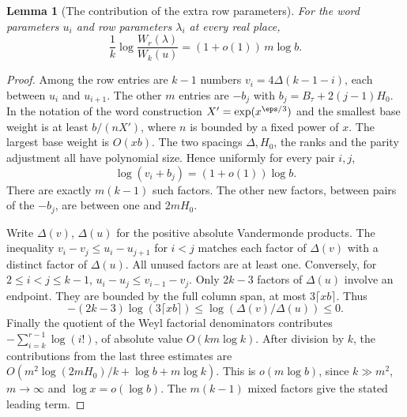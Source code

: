 \documentclass[a4paper,11pt]{article}
\newtheorem{lemma}[proposition]{Lemma}
\theoremstyle{definition}
\theoremstyle{remark}
\numberwithin{equation}{section}
\begin{document}
\begin{lemma}[The contribution of the extra row parameters]
\label{lem:weyl209}
For the word parameters \(u_i\) and row parameters \(\lambda_i\)
at every real place,
\[
       \frac{1}{k}\log\frac{W_r(\lambda)}{W_k(u)}
                             =(1+o(1))\,m\log b .
\]
\end{lemma}
\begin{proof}
Among the row entries are \(k-1\) numbers
\(v_i=4\Delta(k-1-i)\), each between \(u_i\) and \(u_{i+1}\).
The other \(m\) entries are \(-b_j\) with
\(b_j=B_\tau+2(j-1)H_0\). In the notation of the word
construction \(X'=\exp(x^{\eps/3})\) and the smallest base
weight is at least \(b/(nX')\), where \(n\) is bounded by a
fixed power of \(x\). The largest base weight is \(O(xb)\).
The two spacings \(\Delta,H_0\), the ranks and the parity
adjustment all have polynomial size. Hence uniformly for every
pair \(i,j\),
\[
      \log(v_i+b_j)=(1+o(1))\log b.
\]
There are exactly \(m(k-1)\) such factors. The other new factors,
between pairs of the \(-b_j\), are between one and \(2mH_0\).

Write \(\Delta(v)\), \(\Delta(u)\) for the positive absolute
Vandermonde products. The inequality
\(v_i-v_j\le u_i-u_{j+1}\) for \(i<j\) matches each factor
of \(\Delta(v)\) with a distinct factor of \(\Delta(u)\).
All unused factors are at least one. Conversely, for
\(2\le i<j\le k-1\), \(u_i-u_j\le v_{i-1}-v_j\).
Only \(2k-3\) factors of \(\Delta(u)\) involve an endpoint.
They are bounded by the full column span, at most
\(3\lceil xb\rceil\). Thus
\[
 -(2k-3)\log(3\lceil xb\rceil)\le
           \log(\Delta(v)/\Delta(u))\le0 .
\]
Finally the quotient of the Weyl factorial denominators contributes
\(-\sum_{i=k}^{r-1}\log(i!)\), of absolute value \(O(km\log k)\).
After division by \(k\), the contributions from the last three
estimates are \(O(m^2\log(2mH_0)/k+\log b+m\log k)\).
This is \(o(m\log b)\), since \(k\gg m^2\), \(m\to\infty\)
and \(\log x=o(\log b)\). The \(m(k-1)\) mixed factors give
the stated leading term.
\end{proof}
\end{document}

